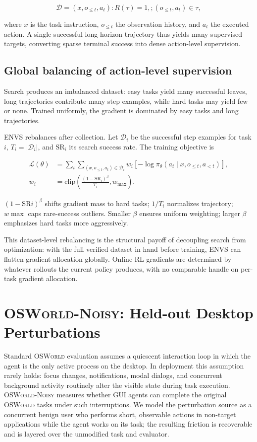 \documentclass[11pt]{article}
\begin{document}
$$\mathcal{D} = {(x, o_{\le t}, a_t) : R(\tau)=1,; (o_{\le t}, a_t) \in \tau},$$

where $x$ is the task instruction, $o_{\le t}$ the observation history, and $a_t$ the executed action. A single successful long-horizon trajectory thus yields many supervised targets, converting sparse terminal success into dense action-level supervision.

\subsection{Global balancing of action-level supervision}
Search produces an imbalanced dataset: easy tasks yield many successful leaves, long trajectories contribute many step examples, while hard tasks may yield few or none. Trained uniformly, the gradient is dominated by easy tasks and long trajectories.

ENVS rebalances after collection. Let $\mathcal{D}_i$ be the successful step examples for task $i$, $T_i = |\mathcal{D}_i|$, and $\mathrm{SR}_i$ its search success rate. The training objective is

\[
\begin{aligned}
\mathcal{L}(\theta)
&=
\sum_i
\sum_{(x,o_{\le t},a_t)\in \mathcal{D}_i}
w_i
\left[-\log \pi_\theta(a_t \mid x,o_{\le t},a_{<t})\right], \\
w_i
&=
\mathrm{clip}\!\left(
\frac{(1-\mathrm{SR}_i)^\beta}{T_i},
w_{\max}
\right).
\end{aligned}
\]

$(1-\mathrm{SR}i)^\beta$ shifts gradient mass to hard tasks; $1/T_i$ normalizes trajectory; $w{\max}$ caps rare-success outliers. Smaller $\beta$ ensures uniform weighting; larger $\beta$ emphasizes hard tasks more aggressively.

This dataset-level rebalancing is the structural payoff of decoupling search from optimization: with the full verified dataset in hand before training, ENVS can flatten gradient allocation globally. Online RL gradients are determined by whatever rollouts the current policy produces, with no comparable handle on per-task gradient allocation.

\section{\textsc{OSWorld-Noisy}: Held-out Desktop Perturbations}

Standard \textsc{OSWorld} evaluation assumes a quiescent interaction
loop in which the agent is the only active process on the desktop. In
deployment this assumption rarely holds: focus changes, notifications,
modal dialogs, and concurrent background activity routinely alter the
visible state during task execution. \textsc{OSWorld-Noisy} measures
whether GUI agents can complete the original \textsc{OSWorld} tasks
under such interruptions. We model the perturbation source as a
concurrent benign user who performs short, observable actions in
non-target applications while the agent works on its task; the
resulting friction is recoverable and is layered over the unmodified
task and evaluator.
\end{document}
